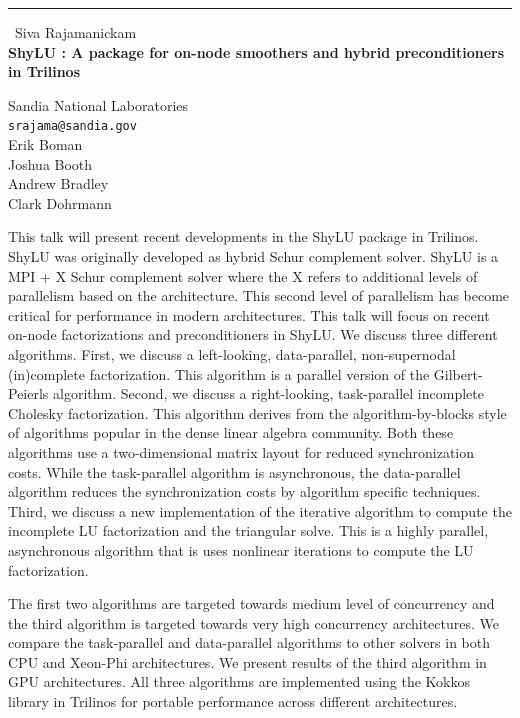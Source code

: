 \documentclass{report}
\begin{document}
\begin{center}
\rule{6in}{1pt} \
{\large Siva Rajamanickam \\
{\bf ShyLU : A package for on-node smoothers and hybrid preconditioners in Trilinos}}

Sandia National Laboratories
\\
{\tt srajama@sandia.gov}\\
Erik Boman\\
Joshua Booth\\
Andrew Bradley\\
Clark Dohrmann\end{center}

This talk will present recent developments in the ShyLU package in Trilinos.
ShyLU was originally developed as hybrid Schur complement solver. ShyLU is
a MPI + X Schur complement solver where the X refers to additional levels of
parallelism based on the architecture. This second level of parallelism has
become critical for performance in modern architectures. This talk
will focus on recent on-node factorizations and preconditioners in ShyLU. We
discuss three different algorithms. First, we discuss a left-looking,
data-parallel, non-supernodal (in)complete factorization. This algorithm is a
parallel version of the Gilbert-Peierls algorithm. Second, we discuss a
right-looking, task-parallel incomplete Cholesky factorization. This algorithm
derives from the algorithm-by-blocks style of algorithms popular in the dense
linear algebra community. Both these algorithms use a two-dimensional matrix
layout for reduced synchronization costs. While the task-parallel algorithm is
asynchronous, the data-parallel algorithm reduces the synchronization costs by
algorithm specific techniques. Third, we discuss a new implementation of the
iterative algorithm to compute the incomplete LU factorization and the
triangular solve. This is a highly parallel, asynchronous algorithm that is
uses nonlinear iterations to compute the LU factorization.

The first two algorithms are targeted towards medium level of concurrency and
the third algorithm is targeted towards very high concurrency architectures.
We compare the task-parallel and data-parallel algorithms to other solvers
in both CPU and Xeon-Phi architectures. We present results of the third
algorithm in GPU architectures. All three algorithms are implemented
using the Kokkos
library in Trilinos for portable performance across different architectures.
\end{document}
